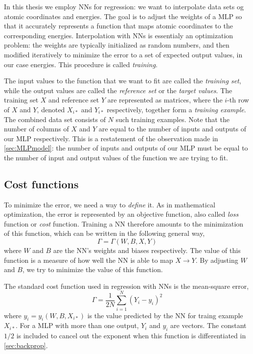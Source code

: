 \documentclass[twoside,english]{uiofysmaster}
\begin{document}
In this thesis we employ NNs for regression: we want to interpolate data sets og atomic coordinates and energies.
The goal is to adjust the weights of a MLP so that it accurately represents a function that maps
atomic coordinates to the corresponding energies. Interpolation with NNs is essentialy an optimization problem:
the weights are typically initialized as random numbers, and then modified iteratively to minimize the error
to a set of expected output values, in our case energies. 
This procedure is called \textit{training}. 

The input values to the function that we want to fit
are called the \textit{training set}, while the output values are called the \textit{reference set} or the \textit{target values}.
The training set $X$ and reference set $Y$ are represented as matrices, where the $i$-th row of $X$ and $Y$, 
denoted $X_{i*}$ and $Y_{i*}$ respectively, 
together form a \textit{training example}. The combined data set consists of $N$ such training examples. 
Note that the number of columns of $X$ and $Y$ are equal to the number of inputs and outputs of our MLP respectively. 
This is a restatement of the observation made in \autoref{sec:MLPmodel}: the number of inputs and outputs of our MLP must be equal 
to the number of input and output values of the function we are trying to fit. 


\subsection{Cost functions} \label{costFunctions}
To minimize the error, we need a way to \textit{define} it. 
As in mathematical optimization, the error is represented by an objective function, also called \textit{loss} function
or \textit{cost} function. Training a NN therefore amounts to the minimization of this function, which can be written in the 
following general way,
\begin{equation}
 \Gamma = \Gamma(W, B, X, Y)
 \label{generalCost}
\end{equation}
where $W$ and $B$ are the NN's weights and biases respectively. 
The value of this function is a measure of how well the NN is able to map $X \rightarrow Y$. 
By adjusting $W$ and $B$, we try to minimize the value of this function.  

The standard cost function used in regression with NNs is the mean-square error,
\begin{equation}
 \Gamma = \frac{1}{2N}\sum_{i=1}^N (Y_i - y_i)^2
 \label{quadraticCost}
\end{equation}
where $y_i = y_i(W, B, X_{i*})$ is the value predicted by the NN for traing example $X_{i*}$. 
For a MLP with more than one output, $Y_i$ and $y_i$ are vectors. 
The constant $1/2$ is included to cancel out the exponent when this function is differentiated in \autoref{sec:backprop}.
\end{document}
